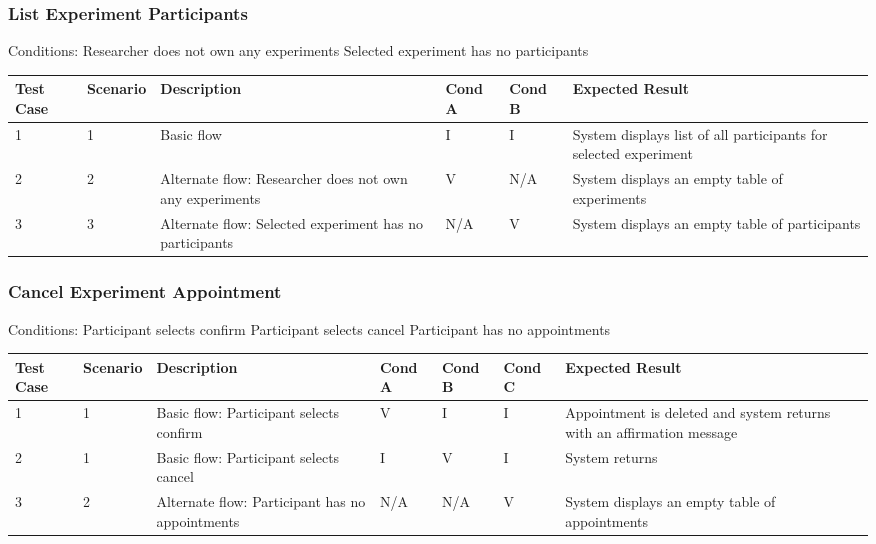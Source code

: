 \begin{landscape}
\subsubsection{List Experiment Participants}
\begin{outline}[enumerate]
\1 [] Conditions:
\2 [A] Researcher does not own any experiments
\2 [B] Selected experiment has no participants
\end{outline}
\begin{table}[!h]
    \begin{tabular}{|l|l|p{3in}|l|l|p{3in}|}
        \hline
        Test Case & Scenario & Description & Cond A & Cond B & Expected Result \\ \hline
        1 & 1 & Basic flow & I & I & System displays list of all participants for selected experiment \\ \hline
        2 & 2 & Alternate flow: Researcher does not own any experiments & V & N/A & System displays an empty table of experiments \\ \hline
        3 & 3 & Alternate flow: Selected experiment has no participants & N/A & V & System displays an empty table of participants \\ \hline
    \end{tabular}
\end{table}

\subsubsection{Cancel Experiment Appointment}
\begin{outline}[enumerate]
\1 [] Conditions:
\2 [A] Participant selects confirm
\2 [B] Participant selects cancel
\2 [C] Participant has no appointments
\end{outline}
\begin{table}[!h]
    \begin{tabular}{|l|l|p{2.75in}|l|l|l|p{2.75in}|}
        \hline
        Test Case & Scenario & Description & Cond A & Cond B & Cond C & Expected Result \\ \hline
        1 & 1 & Basic flow: Participant selects confirm & V & I & I & Appointment is deleted and system returns with an affirmation message \\ \hline
        2 & 1 & Basic flow: Participant selects cancel & I & V & I & System returns \\ \hline
        3 & 2 & Alternate flow: Participant has no appointments & N/A & N/A & V & System displays an empty table of appointments \\ \hline
    \end{tabular}
\end{table}


\end{landscape}
